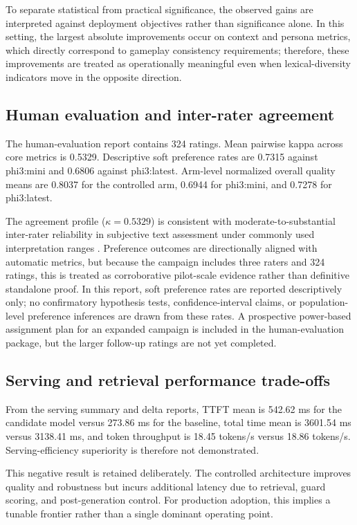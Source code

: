 ﻿\documentclass[a4paper,12pt]{article}
\begin{document}
To separate statistical from practical significance, the observed gains are interpreted against deployment objectives rather than significance alone. In this setting, the largest absolute improvements occur on context and persona metrics, which directly correspond to gameplay consistency requirements; therefore, these improvements are treated as operationally meaningful even when lexical-diversity indicators move in the opposite direction.

\subsection{Human evaluation and inter-rater agreement}
The human-evaluation report contains 324 ratings. Mean pairwise kappa across core metrics is 0.5329. Descriptive soft preference rates are 0.7315 against phi3:mini and 0.6806 against phi3:latest. Arm-level normalized overall quality means are 0.8037 for the controlled arm, 0.6944 for phi3:mini, and 0.7278 for phi3:latest.

The agreement profile (\(\kappa=0.5329\)) is consistent with moderate-to-substantial inter-rater reliability in subjective text assessment under commonly used interpretation ranges \cite{Landis1977KappaScale}. Preference outcomes are directionally aligned with automatic metrics, but because the campaign includes three raters and 324 ratings, this is treated as corroborative pilot-scale evidence rather than definitive standalone proof. In this report, soft preference rates are reported descriptively only; no confirmatory hypothesis tests, confidence-interval claims, or population-level preference inferences are drawn from these rates. A prospective power-based assignment plan for an expanded campaign is included in the human-evaluation package, but the larger follow-up ratings are not yet completed.

\subsection{Serving and retrieval performance trade-offs}

From the serving summary and delta reports, TTFT mean is 542.62 ms for the candidate model versus 273.86 ms for the baseline, total time mean is 3601.54 ms versus 3138.41 ms, and token throughput is 18.45 tokens/s versus 18.86 tokens/s. Serving-efficiency superiority is therefore not demonstrated.

This negative result is retained deliberately. The controlled architecture improves quality and robustness but incurs additional latency due to retrieval, guard scoring, and post-generation control. For production adoption, this implies a tunable frontier rather than a single dominant operating point.
\end{document}
